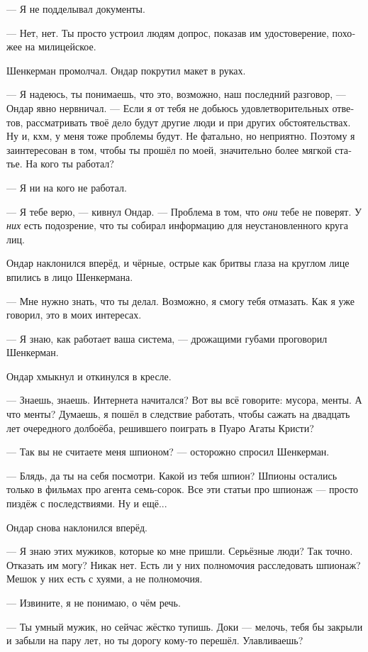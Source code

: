 \documentclass[a5paper,12pt,fleqn]{extbook}\usepackage{cooltooltips}\usepackage{polyglossia}\setdefaultlanguage[babelshorthands=true]{russian}\setotherlanguage{english}\defaultfontfeatures{Ligatures=TeX,Mapping=tex-text} \usepackage{xcolor}\definecolor{lightgray}{HTML}{bbbbbb}\color{lightgray}\newcommand{\ml}[3]{\textenglish{\textcolor{black}{#3}}}
\begin{document}
--- Я не подделывал документы.

--- Нет, нет.
Ты просто устроил людям допрос, показав им удостоверение, похожее на милицейское.

Шенкерман промолчал.
Ондар покрутил макет в руках.

--- Я надеюсь, ты понимаешь, что это, возможно, наш последний разговор, --- Ондар явно нервничал.
--- Если я от тебя не добьюсь удовлетворительных ответов, рассматривать твоё дело будут другие люди и при других обстоятельствах.
Ну и, кхм, у меня тоже проблемы будут.
Не фатально, но неприятно.
Поэтому я заинтересован в том, чтобы ты прошёл по моей, значительно более мягкой статье.
На кого ты работал?

--- Я ни на кого не работал.

--- Я тебе верю, --- кивнул Ондар.
--- Проблема в том, что \emph{они} тебе не поверят.
У \emph{них} есть подозрение, что ты собирал информацию для неустановленного круга лиц.

Ондар наклонился вперёд, и чёрные, острые как бритвы глаза на круглом лице впились в лицо Шенкермана.

--- Мне нужно знать, что ты делал.
Возможно, я смогу тебя отмазать.
Как я уже говорил, это в моих интересах.

--- Я знаю, как работает ваша система, --- дрожащими губами проговорил Шенкерман.

Ондар хмыкнул и откинулся в кресле.

--- Знаешь, знаешь.
Интернета начитался?
Вот вы всё говорите: мусора, менты.
А что менты?
Думаешь, я пошёл в следствие работать, чтобы сажать на двадцать лет очередного долбоёба, решившего поиграть в Пуаро Агаты Кристи?

--- Так вы не считаете меня шпионом? --- осторожно спросил Шенкерман.

--- Блядь, да ты на себя посмотри.
Какой из тебя шпион?
Шпионы остались только в фильмах про агента семь-сорок.
Все эти статьи про шпионаж --- просто пиздёж с последствиями.
Ну и ещё...

Ондар снова наклонился вперёд.

--- Я знаю этих мужиков, которые ко мне пришли.
Серьёзные люди?
Так точно.
Отказать им могу?
Никак нет.
Есть ли у них полномочия расследовать шпионаж?
Мешок у них есть с хуями, а не полномочия.

--- Извините, я не понимаю, о чём речь.

--- Ты умный мужик, но сейчас жёстко тупишь.
Доки --- мелочь, тебя бы закрыли и забыли на пару лет, но ты дорогу кому-то перешёл.
Улавливаешь?
\end{document}
